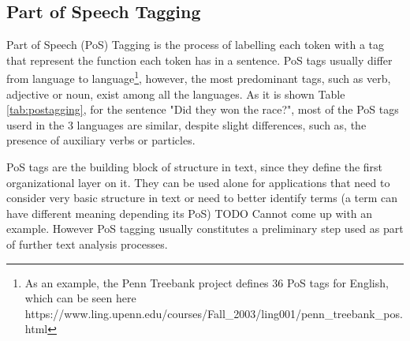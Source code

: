\documentclass{bsu-ms}
\begin{document}
\subsection{Part of Speech Tagging}
Part of Speech (PoS) Tagging is the process of labelling each token with a tag that represent the function each token has in a sentence. PoS tags usually differ from language to language\footnote{As an example, the Penn Treebank project defines 36 PoS tags for English, which can be seen here https://www.ling.upenn.edu/courses/Fall\_2003/ling001/penn\_treebank\_pos.html}, however, the most predominant tags, such as verb, adjective or noun, exist among all the languages. As it is shown  Table \ref{tab:postagging}, for the sentence "Did they won the race?", most of the PoS tags userd in the 3 languages are similar, despite slight differences, such as, the presence of auxiliary verbs or particles.

PoS tags are the building block of structure in text, since they define the first organizational layer on it. They can be used alone for applications that need to consider very basic structure in text or need to better identify terms (a term can have different meaning depending its PoS){\color{red} TODO Cannot come up with an example}. However PoS tagging usually constitutes  a preliminary step used as part of further text analysis processes.
\end{document}
